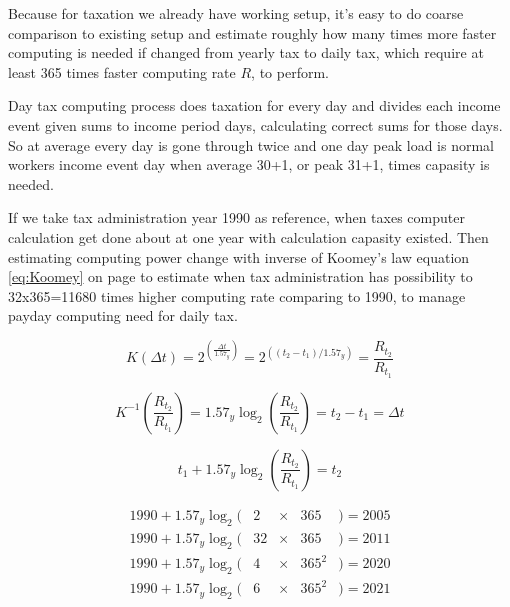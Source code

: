 Because for taxation we already have working setup, it's easy to do coarse
comparison to existing setup and estimate roughly how many times more faster
computing is needed if changed from yearly tax to daily tax, which require at
least 365 times faster computing rate $R$, to perform.

Day tax computing process does taxation for every day and divides each
income event given sums to income period days, calculating correct sums for
those days. So at average every day is gone through twice and one day peak
load is normal workers income event day when average 30+1, or peak 31+1,
times capasity is needed.

If we take tax administration year 1990\cite{VeroItDeployment} as reference,
when taxes computer calculation get done about at one year with calculation
capasity existed. Then estimating computing power change with inverse of
Koomey's law\cite{KoomeysLaw}\cite{DennardScaling}\cite{PerformanceDevelTop500}
equation \ref{eq:Koomey} on page \pageref{eq:Koomey} to estimate when tax
administration has possibility to 32x365=11680 times higher computing rate
comparing to 1990, to manage payday computing need for daily tax.

\begin{equation} \label{eq:Koomey}
	K(\Delta t) =
	2^{(\frac{\Delta t}{1.57_y})} =
	2^{((t_2-t_1)/1.57_y)} =
	\frac{R_{t_2}}{R_{t_1}}
\end{equation}

\begin{equation} \label{eq:InverseKoomey}
	K^{-1}\left(\frac{R_{t_2}}{R_{t_1}}\right) =
	1.57_y \log_2\left(\frac{R_{t_2}}{R_{t_1}}\right) =
	t_2 - t_1 =
	\Delta t
\end{equation}

\begin{equation} \label{eq:InverseKoomeyTime}
t_1 + 1.57_y \log_2\left(\frac{R_{t_2}}{R_{t_1}}\right) = t_2
\end{equation}

\begin{equation} \label{eq:InverseKoomeyTime20052021}
 \begin{array}{lrcll}
	 1990 + 1.57_y \log_2(& 2&\times&365  &) = 2005 \\
	 1990 + 1.57_y \log_2(&32&\times&365  &) = 2011 \\
	 1990 + 1.57_y \log_2(& 4&\times&365^2&) = 2020 \\
	 1990 + 1.57_y \log_2(& 6&\times&365^2&) = 2021
 \end{array}
\end{equation}

